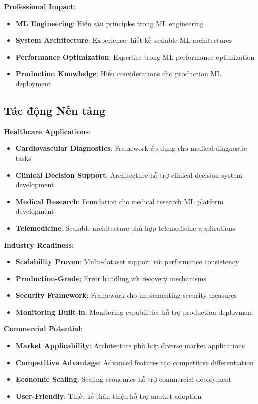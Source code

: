 \textbf{Professional Impact}:
\begin{itemize}
    \item \textbf{ML Engineering}: Hiểu sâu principles trong ML engineering
    \item \textbf{System Architecture}: Experience thiết kế scalable ML architectures
    \item \textbf{Performance Optimization}: Expertise trong ML performance optimization
    \item \textbf{Production Knowledge}: Hiểu considerations cho production ML deployment
\end{itemize}

\subsection{Tác động Nền tảng}\label{subsec:platform-impact}

\textbf{Healthcare Applications}:
\begin{itemize}
    \item \textbf{Cardiovascular Diagnostics}: Framework áp dụng cho medical diagnostic tasks
    \item \textbf{Clinical Decision Support}: Architecture hỗ trợ clinical decision system development
    \item \textbf{Medical Research}: Foundation cho medical research ML platform development
    \item \textbf{Telemedicine}: Scalable architecture phù hợp telemedicine applications
\end{itemize}

\textbf{Industry Readiness}:
\begin{itemize}
    \item \textbf{Scalability Proven}: Multi-dataset support với performance consistency
    \item \textbf{Production-Grade}: Error handling với recovery mechanisms
    \item \textbf{Security Framework}: Framework cho implementing security measures
    \item \textbf{Monitoring Built-in}: Monitoring capabilities hỗ trợ production deployment
\end{itemize}

\textbf{Commercial Potential}:
\begin{itemize}
    \item \textbf{Market Applicability}: Architecture phù hợp diverse market applications
    \item \textbf{Competitive Advantage}: Advanced features tạo competitive differentiation
    \item \textbf{Economic Scaling}: Scaling economics hỗ trợ commercial deployment
    \item \textbf{User-Friendly}: Thiết kế thân thiện hỗ trợ market adoption
\end{itemize}

